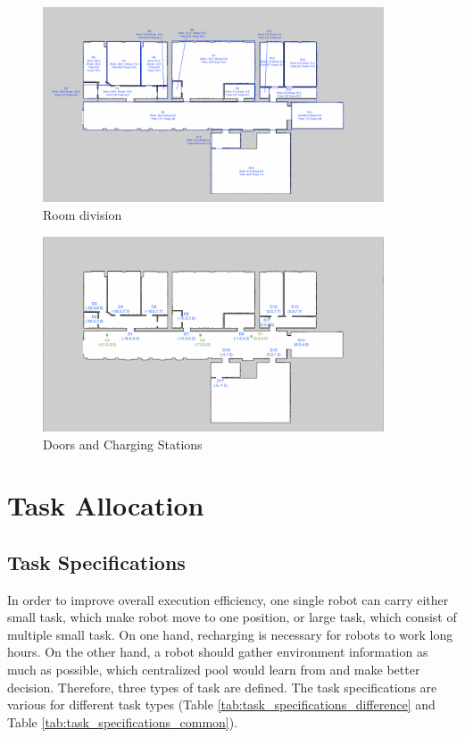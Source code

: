 \begin{figure}[htbp]
	\centering
	\includegraphics[width = 0.9\textwidth]{content/images/ch3/room_division.png}
	\caption{Room division}
	\label{fig:room_division}
\end{figure}

\begin{figure}[htbp]
	\centering
	\includegraphics[width = 0.9\textwidth]{content/images/ch3/positions_door_station.png}
	\caption{Doors and Charging Stations}
	\label{fig:positions_door_station}
\end{figure}

\section{Task Allocation}

\subsection{Task Specifications}
\label{sec:task_specifications}
In order to improve overall execution efficiency, one single robot can carry either small task, which make robot move to one position, or large task, which consist of multiple small task.
On one hand, recharging is necessary for robots to work long hours. On the other hand, a robot should gather environment information as much as possible, which centralized pool would learn from and make better decision. 
Therefore, three types of task are defined. The task specifications are various for different task types (Table \ref{tab:task_specifications_difference} and Table \ref{tab:task_specifications_common}).

